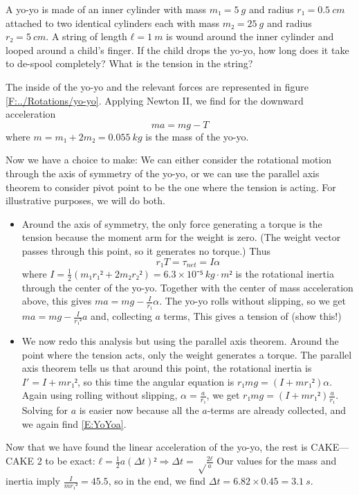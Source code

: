 \begin{example}
A yo-yo is made of an inner cylinder with mass $m₁=5\ g$ and radius $r₁=0.5\ cm$ attached to two identical cylinders each with mass $m₂ = 25\ g$ and radius $r₂ =5\ cm$. A string of length $ℓ=1\ m$ is wound around the inner cylinder and looped around a child's finger. If the child drops the yo-yo, how long does it take to de-spool completely? What is the tension in the string?
\begin{solution}
The inside of the yo-yo and the relevant forces are represented in figure \ref{F:../Rotations/yo-yo}.
Applying Newton II, we find for the downward acceleration 
$$
ma=mg-T
$$
where $m = m₁ + 2m₂ = 0.055\ kg$ is the mass of the yo-yo.

Now we have a choice to make: We can either consider the rotational motion through the axis of symmetry of the yo-yo, or we can use the parallel axis theorem to consider pivot point to be the one where the tension is acting. For illustrative purposes, we will do both. 
\begin{itemize}
	\item Around the axis of symmetry, the only force generating a torque is the tension because the moment arm for the weight is zero. (The weight vector passes through this point, so it generates no torque.) Thus 
$$r₁ T= τ_{net} = I α$$ 
where $I= \frac12(m₁ r₁² +  2m₂ r₂²) = 6.3× 10⁻⁵\ kg\cdot m²$ is the rotational inertia through the center of the yo-yo. Together with the center of mass acceleration above, this gives $ma=mg-\frac I{r₁} α$. The yo-yo rolls without slipping, so we get $ma=mg-\frac I{r₁²} a$ and, collecting $a$ terms, 
This gives a tension of (show this!) 
	\item We now redo this analysis but using the parallel axis theorem. Around the point where the tension acts, only the weight generates a torque. The parallel axis theorem tells us that around this point, the rotational inertia is $I' = I+mr₁²$, so this time the angular equation is $r₁ mg = (I+mr₁²)α$. Again using rolling without slipping, $α = \frac a{r₁}$, we get $r₁ mg = (I+mr₁²)\frac a{r₁}$. Solving for $a$ is easier now because all the $a$-terms are already collected, and we again find \eqref{E:YoYoa}. 
\end{itemize}

Now that we have found the linear acceleration of the yo-yo, the rest is CAKE---CAKE 2 to be exact: $ℓ = \frac12 a(Δt)² ⇒ Δt = √\frac {2ℓ}a$
Our values for the mass and inertia imply $\frac I{mr₁²}=45.5$, so in the end, we find $Δt = 6.82 × 0.45 = 3.1\ s$. 


\end{solution}
\end{example}
